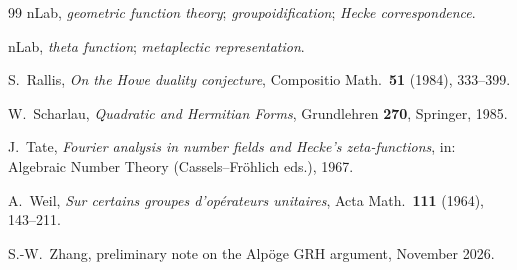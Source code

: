 \documentclass[11pt]{amsart}
\theoremstyle{definition}
\theoremstyle{remark}
\begin{document}
\begin{thebibliography}{99}
 nLab, \emph{geometric function theory}; \emph{groupoidification}; \emph{Hecke correspondence}.

 nLab, \emph{theta function}; \emph{metaplectic representation}.

 S.~Rallis, \emph{On the Howe duality conjecture}, Compositio Math.\ \textbf{51} (1984), 333--399.

 W.~Scharlau, \emph{Quadratic and Hermitian Forms}, Grundlehren \textbf{270}, Springer, 1985.

 J.~Tate, \emph{Fourier analysis in number fields and Hecke's zeta-functions}, in: Algebraic Number Theory (Cassels--Fr\"ohlich eds.), 1967.

 A.~Weil, \emph{Sur certains groupes d'op\'erateurs unitaires}, Acta Math.\ \textbf{111} (1964), 143--211.

 S.-W.~Zhang, preliminary note on the Alp\"oge GRH argument, November 2026.

\end{thebibliography}
\end{document}
